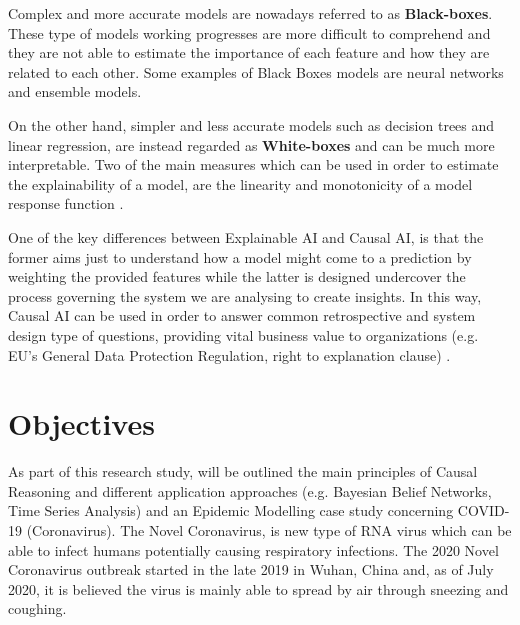 Complex and more accurate models are nowadays referred to as \textbf{Black-boxes}. These type of models working progresses are more difficult to comprehend and they are not able to estimate the importance of each feature and how they are related to each other. Some examples of Black Boxes models are neural networks and ensemble models.

On the other hand, simpler and less accurate models such as decision trees and linear regression, are instead regarded as \textbf{White-boxes} and can be much more interpretable. Two of the main measures which can be used in order to estimate the explainability of a model, are the linearity and monotonicity of a model response function \cite{nove}.

One of the key differences between Explainable AI and Causal AI, is that the former aims just to understand how a model might come to a prediction by weighting the provided features while the latter is designed undercover the process governing the system we are analysing to create insights. In this way, Causal AI can be used in order to answer common retrospective and system design type of questions, providing vital business value to organizations (e.g. EU’s General Data Protection Regulation, right to explanation clause) \cite{causalens}. 

\section{Objectives}
\vspace{-0.1cm}
As part of this research study, will be outlined the main principles of Causal Reasoning and different application approaches (e.g. Bayesian Belief Networks, Time Series Analysis) and an Epidemic Modelling case study concerning COVID-19 (Coronavirus). The Novel Coronavirus, is new type of RNA virus which can be able to infect humans potentially causing respiratory infections. The 2020 Novel Coronavirus outbreak started in the late 2019 in Wuhan, China and, as of July 2020, it is believed the virus is mainly able to spread by air through sneezing and coughing. 